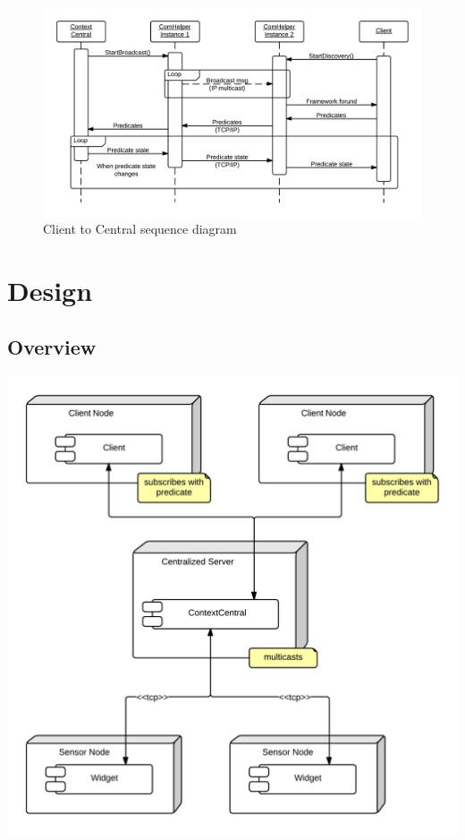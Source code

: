 \documentclass[]{report}
\begin{document}
\begin{figure}
\centering
\includegraphics[width=\linewidth]{comHelperSequence-client.png}
\caption{Client to Central sequence diagram}
\label{fig:clientComHelper}
\end{figure}

\chapter{Design}


\section{Overview}

\begin{center}
\includegraphics[scale=0.2]{ComponentDiagram.png}
\end{center}
\end{document}
